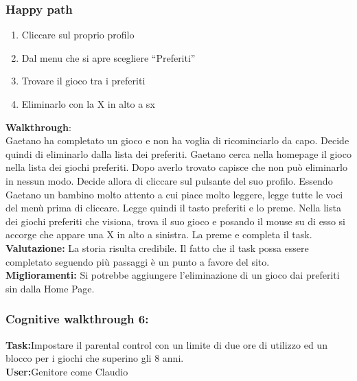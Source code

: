 \documentclass[../Report.tex]{subfiles}
\begin{document}
    \subsubsection{Happy path}
    \begin{enumerate}
        \item Cliccare sul proprio profilo
        \item Dal menu che si apre scegliere “Preferiti” 
        \item Trovare il gioco tra i preferiti
        \item Eliminarlo con la X in alto a sx
        
        
    \end{enumerate}
    \textbf{Walkthrough}:\\
    Gaetano ha completato un gioco  e non ha voglia di ricominciarlo da capo. Decide quindi di eliminarlo dalla lista dei preferiti. Gaetano cerca nella homepage il gioco nella lista dei giochi preferiti. Dopo averlo trovato capisce che non può eliminarlo in nessun modo. Decide allora di cliccare sul pulsante del suo profilo. Essendo Gaetano un bambino molto attento a cui piace molto leggere, legge tutte le voci del menù prima di cliccare. Legge quindi il tasto preferiti e lo preme. Nella lista dei giochi preferiti che visiona, trova il suo gioco e posando il mouse su di esso si accorge che appare una X in alto a sinistra. La preme e completa il task.\\

    \textbf{Valutazione:} La storia risulta credibile. Il fatto che il task possa essere completato seguendo più passaggi è un punto a favore del sito.\\
    
    \textbf{Miglioramenti:} Si potrebbe aggiungere l’eliminazione di un gioco dai preferiti sin dalla Home Page.
    
    \subsubsection{Cognitive walkthrough 6:}
    \textbf{Task:}Impostare il parental control con un limite di due ore di utilizzo ed un blocco per i giochi che superino gli 8 anni.    \\
    \textbf{User:}Genitore come Claudio 
\end{document}

